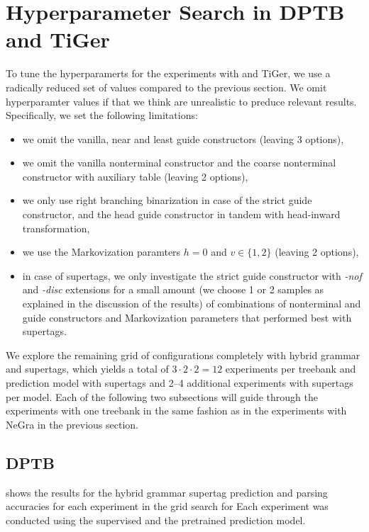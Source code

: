 \documentclass[../../document.tex]{subfiles}
\begin{document}
    \section{Hyperparameter Search in DPTB and TiGer}\label{sec:gridsearch:other}
    To tune the hyperparamerts for the experiments with  and TiGer, we use a radically reduced set of values compared to the previous section.
    We omit hyperparamter values if that we think are unrealistic to preduce relevant results.
    Specifically, we set the following limitations:
    \begin{itemize}
        \item we omit the vanilla, near and least guide constructors (leaving 3 options),
        \item we omit the vanilla nonterminal constructor and the coarse nonterminal constructor with auxiliary table (leaving 2 options), 
        \item we only use right branching binarization in case of the strict guide constructor, and the head guide constructor in tandem with head-inward transformation,
        \item we use the Markovization paramters \(h = 0\) and \(v \in \{1,2\}\) (leaving 2 options),
        \item in case of  supertags, we only investigate the strict guide constructor with \emph{-nof} and \emph{-disc} extensions for a small amount (we choose 1 or 2 samples as explained in the discussion of the results) of combinations of nonterminal and guide constructors and Markovization parameters that performed best with  supertags.
    \end{itemize}

    We explore the remaining grid of configurations completely with hybrid grammar and  supertags, which yields a total of $3 \cdot 2 \cdot 2 = 12$ experiments per treebank and prediction model with  supertags and 2--4 additional experiments with  supertags per model.
    Each of the following two subsections will guide through the experiments with one treebank in the same fashion as in the experiments with NeGra in the previous section.

    \subsection{DPTB}
     shows the results for the hybrid grammar supertag prediction and parsing accuracies for each experiment in the grid search for 
    Each experiment was conducted using the supervised and the pretrained prediction model.
    
\end{document}
